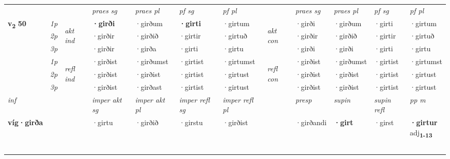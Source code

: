 \begin{longtable}[l]{X>{\footnotesize\itshape}llXXXXlXXXX}
 & &   & \textit{praes sg}  & \textit{praes pl}    & \textit{ pf sg} & \textit{pf pl} & & \textit{praes sg}  & \textit{praes pl}    & \textit{pf sg} & \textit{pf pl }  \\ \cmidrule{4-7} \cmidrule{9-12}
 \multirow{2}{*}{{{\textbf{v{\textsubscript{2}}} \Large{\textbf{50}}}}}  & 1p & \multirow{3}{*}{\begin{turn}{90}\textit{akt ind}\end{turn}} & \textbf{·girði} & ·girðum & \textbf{·girti} & ·girtum & \multirow{3}{*}{\begin{turn}{90}\textit{akt con}\end{turn}} &·girði & ·girðum & ·girti & ·girtum\\*
 & 2p &  &  ·girðir  & ·girðið & ·girtir & ·girtuð & & ·girðir & ·girðið & ·girtir & ·girtuð \\*
 & 3p &  & ·girðir & ·girða & ·girti & ·girtu & & ·girði & ·girði& ·girti & ·girtu \\*
\cmidrule{4-7} \cmidrule{9-12}
 & 1p & \multirow{3}{*}{\begin{turn}{90}\textit{refl ind}\end{turn}}  & ·girðist & ·girðumst & ·girtist & ·girtumst & \multirow{3}{*}{\begin{turn}{90}\textit{refl con}\end{turn}}  &·girðist & ·girðumst & ·girtist & ·girtumst \\*
 & 2p &  & ·girðist & ·girðist & ·girtist & ·girtust & &·girðist & ·girðist & ·girtist & ·girtust \\*
 & 3p  & & ·girðist & ·girðast & ·girtist & ·girtust & & ·girðist & ·girðist& ·girtist & ·girtust \\*
\cmidrule{4-7} \cmidrule{9-12}

   {\textit{inf}} & &  & \textit{imper akt sg} & \textit{imper akt pl} & \textit{imper refl sg} & \textit{imper refl pl} && \textit{presp} & \textit{supin} & \textit{supin refl} & \textit{pp m} \\*
  {\textbf{víg\allowbreak ·girða}} & && ·girtu  & ·girðið & ·girstu & ·girðist && ·girðandi &  \textbf{·girt} & ·girst & \specialcell{\textbf{·girtur} \\ adj\textbf{\textsubscript{1-13}}} \\*

\midrule
 & \\*
   & \\*
   & \\*
   & \\*
  & \\
   \midrule


\end{longtable}
